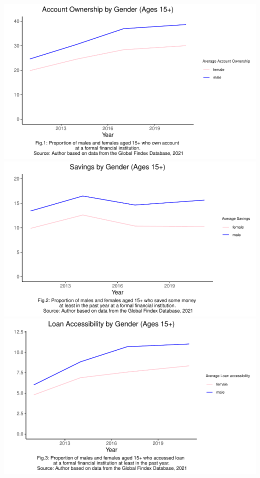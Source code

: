 \documentclass[preprint, 3p,
authoryear]{elsarticle} %
\begin{document}
\includegraphics{504.Project1_files/figure-latex/unnamed-chunk-3-1.pdf}
\includegraphics{504.Project1_files/figure-latex/unnamed-chunk-3-2.pdf}
\includegraphics{504.Project1_files/figure-latex/unnamed-chunk-3-3.pdf}
\end{document}
